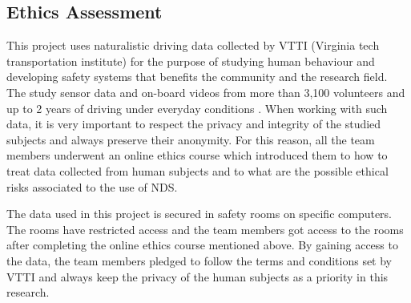 \subsection{Ethics Assessment}

This project uses naturalistic driving data collected by VTTI (Virginia tech transportation institute) for the purpose of studying human behaviour and developing safety systems that benefits the community and the research field. The study sensor data and on-board videos from more than 3,100 volunteers and up to 2 years of driving under everyday conditions \cite{shrp2}. When working with such data, it is very important to respect the privacy and integrity of the studied subjects and always preserve their anonymity. For this reason, all the team members underwent an online ethics course which introduced them to how to treat data collected from human subjects and to what are the possible ethical risks associated to the use of NDS.

The data used in this project is secured in safety rooms on specific computers. The rooms have restricted access and the team members got access to the rooms after completing the online ethics course mentioned above. By gaining access to the data, the team members pledged to follow the terms and conditions set by VTTI and always keep the privacy of the human subjects as a priority in this research.